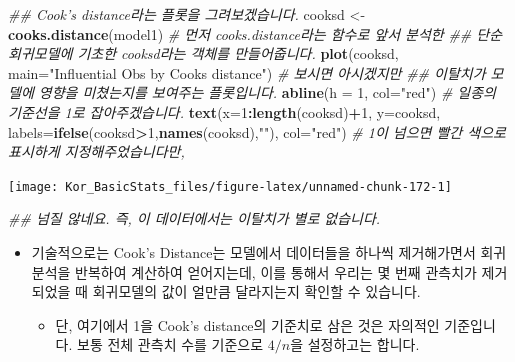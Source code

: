 \documentclass[]{book}
\newenvironment{Shaded}{\begin{snugshade}}{\end{snugshade}}
\newcommand{\CommentTok}[1]{\textcolor[rgb]{0.56,0.35,0.01}{\textit{#1}}}
\newcommand{\DataTypeTok}[1]{\textcolor[rgb]{0.13,0.29,0.53}{#1}}
\newcommand{\DecValTok}[1]{\textcolor[rgb]{0.00,0.00,0.81}{#1}}
\newcommand{\KeywordTok}[1]{\textcolor[rgb]{0.13,0.29,0.53}{\textbf{#1}}}
\newcommand{\NormalTok}[1]{#1}
\newcommand{\OperatorTok}[1]{\textcolor[rgb]{0.81,0.36,0.00}{\textbf{#1}}}
\newcommand{\StringTok}[1]{\textcolor[rgb]{0.31,0.60,0.02}{#1}}
\begin{document}
\begin{itemize}
\begin{Shaded}
\begin{Highlighting}[]
\CommentTok{## Cook's distance라는 플롯을 그려보겠습니다.}
\NormalTok{cooksd <-}\StringTok{ }\KeywordTok{cooks.distance}\NormalTok{(model1) }\CommentTok{# 먼저 cooks.distance라는 함수로 앞서 분석한}
\CommentTok{## 단순회귀모델에 기초한 cooksd라는 객체를 만들어줍니다.}
\KeywordTok{plot}\NormalTok{(cooksd, }\DataTypeTok{main=}\StringTok{"Influential Obs by Cooks distance"}\NormalTok{) }\CommentTok{# 보시면 아시겠지만}
\CommentTok{## 이탈치가 모델에 영향을 미쳤는지를 보여주는  플롯입니다.}
\KeywordTok{abline}\NormalTok{(}\DataTypeTok{h =} \DecValTok{1}\NormalTok{, }\DataTypeTok{col=}\StringTok{"red"}\NormalTok{)  }\CommentTok{# 일종의 기준선을 1로 잡아주겠습니다.}
\KeywordTok{text}\NormalTok{(}\DataTypeTok{x=}\DecValTok{1}\OperatorTok{:}\KeywordTok{length}\NormalTok{(cooksd)}\OperatorTok{+}\DecValTok{1}\NormalTok{, }\DataTypeTok{y=}\NormalTok{cooksd, }\DataTypeTok{labels=}\KeywordTok{ifelse}\NormalTok{(cooksd}\OperatorTok{>}\DecValTok{1}\NormalTok{,}\KeywordTok{names}\NormalTok{(cooksd),}\StringTok{""}\NormalTok{),}
     \DataTypeTok{col=}\StringTok{"red"}\NormalTok{)  }\CommentTok{# 1이 넘으면 빨간 색으로 표시하게 지정해주었습니다만,}
\end{Highlighting}
\end{Shaded}

  \begin{center}\texttt{[image: Kor\_BasicStats\_files/figure-latex/unnamed-chunk-172-1]} \end{center}

\begin{Shaded}
\begin{Highlighting}[]
\CommentTok{## 넘질 않네요. 즉, 이 데이터에서는 이탈치가 별로 없습니다.}
\end{Highlighting}
\end{Shaded}

  \begin{itemize}
  \item
    기술적으로는 Cook's Distance는 모델에서 데이터들을 하나씩 제거해가면서 회귀분석을 반복하여 계산하여 얻어지는데, 이를 통해서 우리는 몇 번째 관측치가 제거되었을 때 회귀모델의 값이 얼만큼 달라지는지 확인할 수 있습니다.

    \begin{itemize}
    \item
      단, 여기에서 1을 Cook's distance의 기준치로 삼은 것은 자의적인 기준입니다. 보통 전체 관측치 수를 기준으로 \(4/n\)을 설정하고는 합니다.


\end{itemize}
\end{itemize}
\end{itemize}
\end{document}
